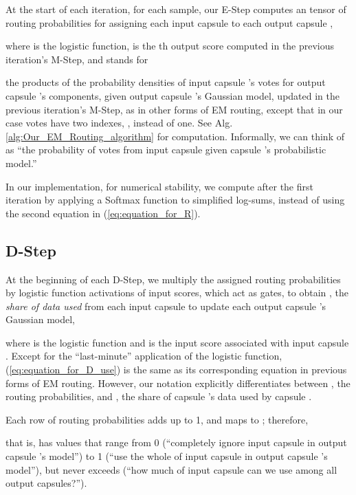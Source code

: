 \documentclass[11pt,a4paper]{article}
\begin{document}
At the start of each iteration, for each sample, our E-Step computes an  tensor  of routing probabilities for assigning each input capsule  to each output capsule ,



where  is the logistic function,  is the th output score computed in the previous iteration's M-Step, and  stands for



the products of the probability densities of input capsule 's votes for output capsule 's  components, given output capsule 's Gaussian model, updated in the previous iteration's M-Step, as in other forms of EM routing, except that in our case votes have two indexes, , instead of one. See Alg. \ref{alg:Our_EM_Routing_algorithm} for computation. Informally, we can think of  as ``the probability of votes from input capsule  given capsule 's probabilistic model.''

In our implementation, for numerical stability, we compute  after the first iteration by applying a Softmax function to simplified log-sums, instead of using the second equation in (\ref{eq:equation_for_R}).

\subsection{D-Step}\label{ssec:D_Step}

At the beginning of each D-Step, we multiply the assigned routing probabilities  by logistic function activations of input scores, which act as gates, to obtain , the \emph{share of data used} from each input capsule  to update each output capsule 's Gaussian model,



where  is the logistic function and  is the input score associated with input capsule . Except for the ``last-minute'' application of the logistic function, (\ref{eq:equation_for_D_use}) is the same as its corresponding equation in previous forms of EM routing. However, our notation explicitly differentiates between , the routing probabilities, and , the share of capsule 's data used by capsule .

Each row of routing probabilities  adds up to 1, and  maps  to ; therefore,



that is,  has values that range from 0 (``completely ignore input capsule  in output capsule 's model'') to 1 (``use the whole of input capsule  in output capsule 's model''), but never exceeds  (``how much of input capsule  can we use among all output capsules?'').
\end{document}

